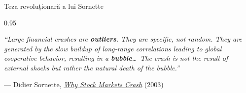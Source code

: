 \documentclass[9pt, aspectratio=169, t]{beamer}
\begin{document}
\begin{frame}{Teza revoluționară a lui Sornette}
    \begin{cminipage}{0.95\textwidth}
    {\footnotesize
    \begin{center}
        \begin{minipage}{0.9\textwidth}
            \begin{exampleblock}{}
                \large\centering
                \textit{``Large financial crashes are \textbf{outliers}. They are specific, not random. They are generated by the slow buildup of long-range correlations leading to global cooperative behavior, resulting in a \textbf{bubble}\ldots\ The crash is not the result of external shocks but rather the natural death of the bubble.''}

                \vspace{2mm}
                \hfill --- Didier Sornette, \href{https://press.princeton.edu/books/paperback/9780691175959/why-stock-markets-crash}{\textit{Why Stock Markets Crash}} (2003)
            \end{exampleblock}
        \end{minipage}
    \end{center}

}
\end{cminipage}
\end{frame}
\end{document}
